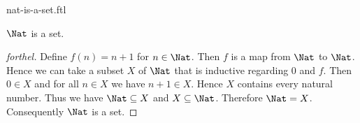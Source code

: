 \documentclass{naproche-library}
\begin{document}
\begin{smodule}[title=The Natural Numbers Form a Set]{nat-is-a-set.ftl}

\begin{proposition}[forthel,id=ARITHMETIC_07_4685510236547454]
  $\Nat$ is a set.
\end{proposition}
\begin{proof}[forthel]
  Define $f(n) = n + 1$ for $n \in \Nat$.
  Then $f$ is a map from $\Nat$ to $\Nat$.
  Hence we can take a subset $X$ of $\Nat$ that is inductive regarding
  $0$ and $f$.
  Then $0 \in X$ and for all $n \in X$ we have $n + 1 \in X$.
  Hence $X$ contains every natural number.
  Thus we have $\Nat \subseteq X$ and $X \subseteq \Nat$.
  Therefore $\Nat = X$.
  Consequently $\Nat$ is a set.
\end{proof}
\end{smodule}
\end{document}
